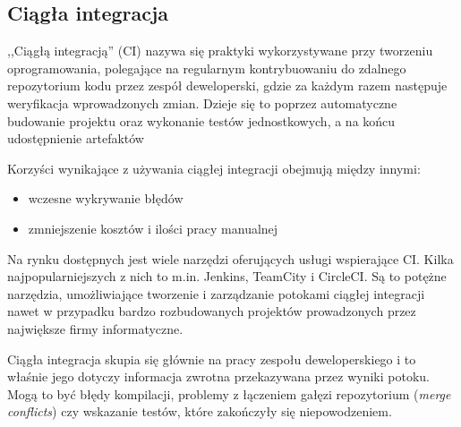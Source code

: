 \documentclass[twoside,a4paper]{report}
\begin{document}
\subsection{Ciągła integracja}
,,Ciągłą integracją'' (CI) nazywa się praktyki wykorzystywane przy tworzeniu oprogramowania, polegające na regularnym kontrybuowaniu do zdalnego repozytorium kodu przez zespół deweloperski, gdzie za każdym razem następuje weryfikacja wprowadzonych zmian.
Dzieje się to poprzez automatyczne budowanie projektu oraz wykonanie testów jednostkowych, a na końcu udostępnienie artefaktów

Korzyści wynikające z używania ciągłej integracji obejmują między innymi:
\begin{itemize}[noitemsep,topsep=0pt]
    \item wczesne wykrywanie błędów
    \item zmniejszenie kosztów i ilości pracy manualnej
\end{itemize}

Na rynku dostępnych jest wiele narzędzi oferujących usługi wspierające CI\@.
Kilka najpopularniejszych z nich to m.in. Jenkins, TeamCity i CircleCI\@.
Są to potężne narzędzia, umożliwiające tworzenie i zarządzanie potokami ciągłej integracji nawet w przypadku bardzo rozbudowanych projektów prowadzonych przez największe firmy informatyczne.

Ciągła integracja skupia się głównie na pracy zespołu deweloperskiego i to właśnie jego dotyczy informacja zwrotna przekazywana przez wyniki potoku.
Mogą to być błędy kompilacji, problemy z łączeniem gałęzi repozytorium (\textit{merge conflicts}) czy wskazanie testów, które zakończyły się niepowodzeniem.
\end{document}
